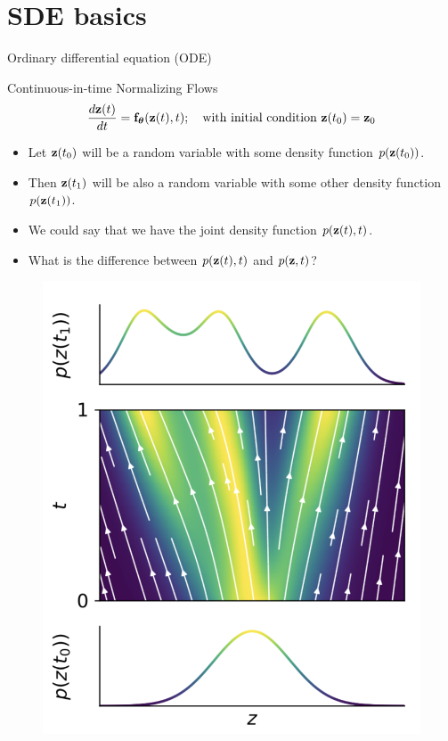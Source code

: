 \section{SDE basics}
\begin{frame}{Ordinary differential equation (ODE)}
	\begin{block}{Continuous-in-time Normalizing Flows}
		\vspace{-0.3cm}
		\[
  			\frac{d \mathbf{z}(t)}{dt} = \mathbf{f}_{\boldsymbol{\theta}}(\mathbf{z}(t), t); \quad \text{with initial condition }\mathbf{z}(t_0) = \mathbf{z}_0
		\]
		\vspace{-0.5cm}
	\end{block}
	\begin{minipage}[t]{0.6\columnwidth}
		\begin{itemize}
			\item Let $\mathbf{z}(t_0)$ will be a random variable with some density function $p(\mathbf{z}(t_0))$.
		 	\item Then $\mathbf{z}(t_1)$ will be also a random variable with some other density function $p(\mathbf{z}(t_1))$.
			\item We could say that we have the joint density function $p(\mathbf{z}(t), t)$.
			\item What is the difference between $p(\mathbf{z}(t), t)$ and $p(\mathbf{z}, t)$?
		\end{itemize}
	\end{minipage}%
	\begin{minipage}[t]{0.4\columnwidth}	
		\begin{figure}
			\centering
			\includegraphics[width=\linewidth]{figs/cnf_flow.png}
		\end{figure}
	\end{minipage}
\end{frame}
